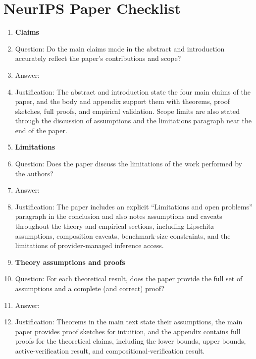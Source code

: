 \section*{NeurIPS Paper Checklist}

\begin{enumerate}

\item {\bf Claims}
    \item[] Question: Do the main claims made in the abstract and introduction accurately reflect the paper's contributions and scope?
    \item[] Answer: \answerYes{}
    \item[] Justification: The abstract and introduction state the four main claims of the paper, and the body and appendix support them with theorems, proof sketches, full proofs, and empirical validation. Scope limits are also stated through the discussion of assumptions and the limitations paragraph near the end of the paper.

\item {\bf Limitations}
    \item[] Question: Does the paper discuss the limitations of the work performed by the authors?
    \item[] Answer: \answerYes{}
    \item[] Justification: The paper includes an explicit ``Limitations and open problems'' paragraph in the conclusion and also notes assumptions and caveats throughout the theory and empirical sections, including Lipschitz assumptions, composition caveats, benchmark-size constraints, and the limitations of provider-managed inference access.

\item {\bf Theory assumptions and proofs}
    \item[] Question: For each theoretical result, does the paper provide the full set of assumptions and a complete (and correct) proof?
    \item[] Answer: \answerYes{}
    \item[] Justification: Theorems in the main text state their assumptions, the main paper provides proof sketches for intuition, and the appendix contains full proofs for the theoretical claims, including the lower bounds, upper bounds, active-verification result, and compositional-verification result.


\end{enumerate}
